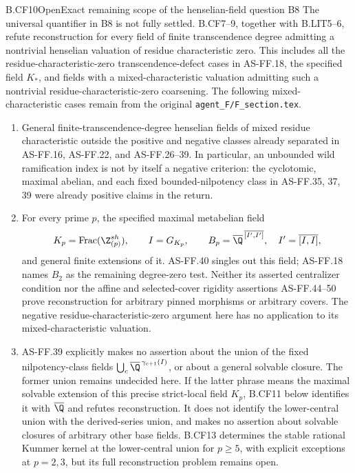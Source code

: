 \begin{claim}{B.CF10}{Open}{Exact remaining scope of the henselian-field question B8}
The universal quantifier in B8 is not fully settled. B.CF7--9,
together with B.LIT5--6, refute reconstruction for every field of
finite transcendence degree admitting a nontrivial henselian
valuation of residue characteristic zero. This includes all the
residue-characteristic-zero transcendence-defect cases in AS-FF.18,
the specified field \(K_*\), and fields with a mixed-characteristic
valuation admitting such a nontrivial residue-characteristic-zero
coarsening. The following mixed-characteristic cases remain from
the original \texttt{agent\_F/F\_section.tex}.
\begin{enumerate}
\item General finite-transcendence-degree henselian fields of mixed
residue characteristic outside the positive and negative classes
already separated in AS-FF.16, AS-FF.22, and AS-FF.26--39.
In particular, an unbounded wild ramification index is not by itself
a negative criterion: the cyclotomic, maximal abelian, and each fixed
bounded-nilpotency class in AS-FF.35, 37, 39 were already positive
claims in the return.
\item For every prime \(p\), the specified maximal metabelian field
\[
 K_p=\operatorname{Frac}(\Z_{(p)}^{sh}),\qquad
 I=G_{K_p},\qquad
 B_p=\overline\Q^{\,\overline{[I',I']}},\quad
 I'=\overline{[I,I]},
\]
and general finite extensions of it. AS-FF.40 singles out this
field; AS-FF.18 names \(B_2\) as the remaining degree-zero test.
Neither its asserted centralizer condition nor the affine and
selected-cover rigidity assertions AS-FF.44--50 prove reconstruction
for arbitrary pinned morphisms or arbitrary covers. The negative
residue-characteristic-zero argument here has no application to its
mixed-characteristic valuation.
\item AS-FF.39 explicitly makes no assertion about the union of
the fixed nilpotency-class fields
\(\bigcup_c\overline\Q^{\,\gamma_{c+1}(I)}\), or about a general
solvable closure. The former union remains undecided here. If the
latter phrase means the maximal solvable extension of this precise
strict-local field \(K_p\), B.CF11 below identifies it with
\(\overline\Q\) and refutes reconstruction. It does not identify
the lower-central union with the derived-series union, and makes no
assertion about solvable closures of arbitrary other base fields.
B.CF13 determines the stable rational Kummer kernel at the
lower-central union for \(p\geq5\), with explicit exceptions
at \(p=2,3\), but its full reconstruction problem remains open.
\end{enumerate}
\end{claim}
